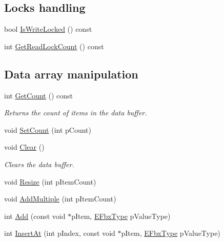 \subsection*{Locks handling}
\begin{DoxyCompactItemize}
\item 
bool \hyperlink{class_fbx_layer_element_array_a16cf9a248965cbe26d932c3fb6869c85}{Is\+Write\+Locked} () const
\item 
int \hyperlink{class_fbx_layer_element_array_a2d832cc56fee7d1c1254e88e689f1eda}{Get\+Read\+Lock\+Count} () const
\end{DoxyCompactItemize}
\subsection*{Data array manipulation}
\begin{DoxyCompactItemize}
\item 
int \hyperlink{class_fbx_layer_element_array_acd195095246f6d886d55fd0aa7129b2d}{Get\+Count} () const
\begin{DoxyCompactList}\small\item\em Returns the count of items in the data buffer. \end{DoxyCompactList}\item 
void \hyperlink{class_fbx_layer_element_array_a3a8d1c285bb30e8d0dfdf71f819fa57b}{Set\+Count} (int p\+Count)
\item 
void \hyperlink{class_fbx_layer_element_array_a573662ad442d13623725fef4e19ca207}{Clear} ()
\begin{DoxyCompactList}\small\item\em Clears the data buffer. \end{DoxyCompactList}\item 
void \hyperlink{class_fbx_layer_element_array_a7dff6a6150f4dff69c83070a7c675db6}{Resize} (int p\+Item\+Count)
\item 
void \hyperlink{class_fbx_layer_element_array_a53c4b42b43239dc99f82625b1fb65774}{Add\+Multiple} (int p\+Item\+Count)
\item 
int \hyperlink{class_fbx_layer_element_array_a828c096f6e750eec65f59a86d0204e12}{Add} (const void $\ast$p\+Item, \hyperlink{fbxpropertytypes_8h_a73913a5ddfb20e57c6f25e9e6784bd92}{E\+Fbx\+Type} p\+Value\+Type)
\item 
int \hyperlink{class_fbx_layer_element_array_ac781bfbc43232bde51bbf04ab543cd13}{Insert\+At} (int p\+Index, const void $\ast$p\+Item, \hyperlink{fbxpropertytypes_8h_a73913a5ddfb20e57c6f25e9e6784bd92}{E\+Fbx\+Type} p\+Value\+Type)

\end{DoxyCompactItemize}

